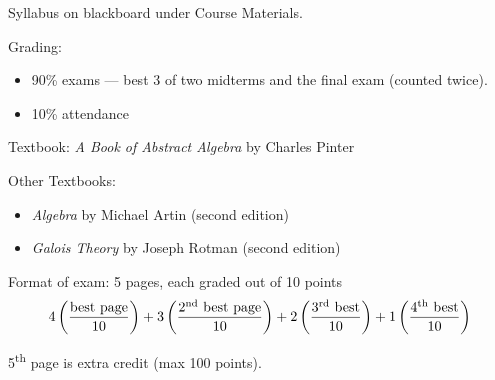 \documentclass[12pt,letterpaper,DIV=11,final]{scrartcl}
\theoremstyle{plain}
\theoremstyle{definition}
\theoremstyle{remark}
\begin{document}
Syllabus on blackboard under Course Materials.

Grading:
\begin{itemize}
  \item 90\% exams --- best 3 of two midterms and the final exam (counted twice).
  \item 10\% attendance
\end{itemize}

Textbook: \emph{A Book of Abstract Algebra} by Charles Pinter

Other Textbooks:
\begin{itemize}
  \item \emph{Algebra} by Michael Artin (second edition)
  \item \emph{Galois Theory} by Joseph Rotman (second edition)
\end{itemize}

Format of exam: 5 pages, each graded out of 10 points
\begin{displaymath}
  4 \left( \frac{\text{best page}}{10} \right) + 3 \left( \frac{\text{2\textsuperscript{nd} best page}}{10} \right) + 2 \left( \frac{\text{3\textsuperscript{rd} best}}{10} \right) + 1 \left( \frac{\text{4\textsuperscript{th} best}}{10} \right)
\end{displaymath}

5\textsuperscript{th} page is extra credit (max 100 points).
\end{document}
